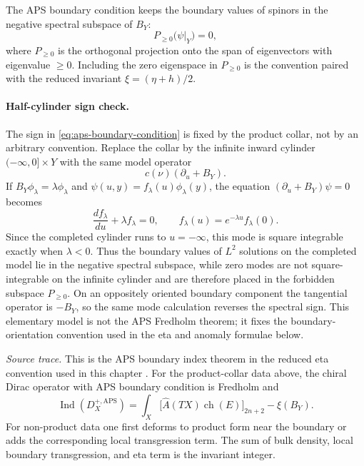 The APS boundary condition keeps the boundary values of spinors in the
negative spectral subspace of \(B_Y\):
\begin{equation}
  P_{\geq0}\bigl(\psi|_Y\bigr)=0,
  \label{eq:aps-boundary-condition}
\end{equation}
where \(P_{\geq0}\) is the orthogonal projection onto the span of eigenvectors
with eigenvalue \(\geq0\).  Including the zero eigenspace in \(P_{\geq0}\) is
the convention paired with the reduced invariant \(\xi=(\eta+h)/2\).

\paragraph{Half-cylinder sign check.}
The sign in \eqref{eq:aps-boundary-condition} is fixed by the product collar,
not by an arbitrary convention.  Replace the collar by the infinite inward
cylinder \((-\infty,0]\times Y\) with the same model operator
\[
  c(\nu)(\partial_u+B_Y).
\]
If \(B_Y\phi_\lambda=\lambda\phi_\lambda\) and
\(\psi(u,y)=f_\lambda(u)\phi_\lambda(y)\), the equation
\((\partial_u+B_Y)\psi=0\) becomes
\[
  \frac{d f_\lambda}{du}+\lambda f_\lambda=0,
  \qquad
  f_\lambda(u)=e^{-\lambda u}f_\lambda(0).
\]
Since the completed cylinder runs to \(u=-\infty\), this mode is square
integrable exactly when \(\lambda<0\).  Thus the boundary values of \(L^2\)
solutions on the completed model lie in the negative spectral subspace, while
zero modes are not square-integrable on the infinite cylinder and are
therefore placed in the forbidden subspace \(P_{\ge0}\).  On an oppositely
oriented boundary component the tangential operator is \(-B_Y\), so the same
mode calculation reverses the spectral sign.  This elementary model is not the
APS Fredholm theorem; it fixes the boundary-orientation convention used in the
eta and anomaly formulae below.

\begin{quotedtheorem}
\label{qthm:aps-index-formula}
\emph{Source trace.}  This is the APS boundary index theorem in the reduced
eta convention used in this chapter
\cite{APS1975I,APS1975II,APS1976III}.
For the product-collar data above, the chiral Dirac operator with APS
boundary condition is Fredholm and
\begin{equation}
  \operatorname{Ind}(D_X^{+,\mathrm{APS}})
  =
  \int_X
  \bigl[\widehat A(TX)\operatorname{ch}(E)\bigr]_{2n+2}
  -
  \xi(B_Y).
  \label{eq:aps-index-formula}
\end{equation}
For non-product data one first deforms to product form near the boundary or
adds the corresponding local transgression term.  The sum of bulk density,
local boundary transgression, and eta term is the invariant integer.
\end{quotedtheorem}

